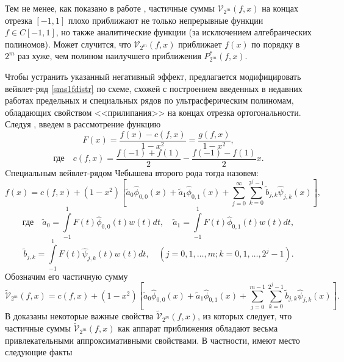 Тем не менее, как показано в работе \cite{sms112}, частичные суммы $\mathcal{V}_{2^m}(f, x)$ на концах отрезка $[-1,1]$ плохо приближают не только непрерывные функции $f \in C[-1,1]$, но также аналитические функции (за исключением алгебраических полиномов).
Может случится, что $\mathcal{V}_{2^m}(f, x)$ приближает $f(x)$ по порядку в $2^m$ раз хуже, чем полином наилучшего приближения $P^{*}_{2^m}(f,x)$.

Чтобы устранить указанный негативный эффект, предлагается модифицировать вейвлет-ряд \eqref{sms1fdistr} по схеме, схожей с построением введенных в недавних работах \cite{sms12,sms13}
предельных и специальных рядов по ультрасферическим полиномам, обладающих свойством <<прилипания>> на концах отрезка ортогональности. Следуя \cite{sms13},
введем в рассмотрение функцию
\begin{equation}
\label{sms1Ffunk}
F(x) = \frac{f(x)-c(f,x)}{1-x^2} = \frac{g(f,x)}{1-x^2},
\end{equation}
\begin{equation*}
\label{sms1af}
\text{где}\quad c(f,x) = \frac{f(-1) + f(1)}{2} - \frac{f(-1) - f(1)}{2} x.
\end{equation*}
Cпециальным вейвлет-рядом Чебышева второго рода тогда назовем:
\begin{equation*}
\label{sms1fFunk}
f(x)=
c(f,x)+(1-x^2) \left[ \tilde{a}_{0}\hat{\phi}_{0,0}(x) + \tilde{a}_{1}\hat{\phi}_{0,1}(x) + \sum\limits_{j=0}^{\infty} \sum\limits_{k=0}^{2^j-1} \tilde{b}_{j,k}\hat{\psi}_{j,k}(x) \right],
\end{equation*}
\begin{equation*}
\text{где}\quad \tilde{a}_{0} = \int\limits_{-1}^{1} F(t)\hat{\phi}_{0,0}(t) w(t)dt, \quad
\tilde{a}_{1} = \int\limits_{-1}^{1} F(t)\hat{\phi}_{0,1}(t) w(t) dt,
\end{equation*}
\begin{equation*}
\label{sms1efcoeffB}
\tilde{b}_{j,k} = \int\limits_{-1}^{1} F(t)\hat{\psi}_{j,k}(t) w(t) dt, \quad (j=0,1, \ldots, m; k = 0, 1, \ldots, 2^j-1).
\end{equation*}
Обозначим его частичную сумму
\begin{equation}
\label{sms1fFunkSum}
\tilde{\mathcal{V}}_{2^m}(f,x)  = c(f,x)+(1-x^2) \left[ \tilde{a}_{0}\hat{\phi}_{0,0}(x) + \tilde{a}_{1}\hat{\phi}_{0,1}(x) + \sum\limits_{j=0}^{m-1} \sum\limits_{k=0}^{2^j-1} \tilde{b}_{j,k}\hat{\psi}_{j,k}(x) \right].
\end{equation}
В \cite{sms112} доказаны некоторые важные свойства $\tilde{\mathcal{V}}_{2^m}(f,x)$, из которых следует, что частичные суммы $\tilde{\mathcal{V}}_{2^m}(f,x)$ как аппарат приближения обладают весьма привлекательными аппроксимативными свойствами. В частности, имеют место следующие факты

